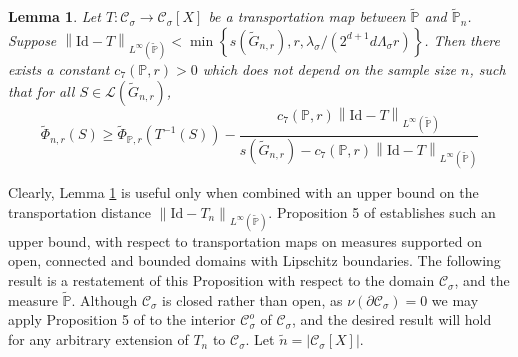 \documentclass[11pt,twoside]{article}
\newtheorem{lemma}{Lemma}
\newcommand{\set}[1]{\left\{#1\right\}}
\newcommand{\abs}[1]{\left \lvert #1 \right \rvert}
\newcommand{\norm}[1]{\left\lVert#1\right\rVert}
\newcommand{\1}{\mathbf{1}}
\newcommand{\Xbf}{X}             %
\newcommand{\Pbb}{\mathbb{P}}
\newcommand{\Cset}{\mathcal{C}}
\newcommand{\Csig}{\Cset_{\sigma}}
\begin{document}
\begin{lemma}
	\label{lem: graph_to_continuous_conductance}
	Let $T:\Csig \to \Csig[\Xbf]$ be a transportation map between $\widetilde{\Pbb}$ and $\widetilde{\Pbb}_n$. Suppose $\norm{\mathrm{Id} - T}_{L^{\infty}(\widetilde{\Pbb})} < \min \set{s(\widetilde{G}_{n,r}),r, \lambda_{\sigma}/(2^{d+1}d\Lambda_{\sigma}r)}$. Then there exists a constant $c_7(\Pbb,r) > 0$ which does not depend on the sample size $n$, such that for all $S \in \mathcal{L}(\widetilde{G}_{n,r})$, 
	\begin{equation}
	\label{eqn: graph_to_continuous_conductance}
	\widetilde{\Phi}_{n,r}(S) \geq \widetilde{\Phi}_{\Pbb,r}(T^{-1}(S)) - \frac{c_7(\Pbb,r)\norm{\mathrm{Id} - T}_{L^{\infty}(\widetilde{\Pbb})} }{s(\widetilde{G}_{n,r}) - c_7(\Pbb,r) \norm{\mathrm{Id} - T}_{L^{\infty}(\widetilde{\Pbb})}  }
	\end{equation}
\end{lemma}

Clearly, Lemma \ref{lem: graph_to_continuous_conductance} is useful only when combined with an upper bound on the transportation distance $\norm{\mathrm{Id} - T_n}_{L^{\infty}(\widetilde{\Pbb})}$. Proposition 5 of \cite{garciatrillos16} establishes such an upper bound, with respect to transportation maps on measures supported on open, connected and bounded domains with Lipschitz boundaries. The following result is a restatement of this Proposition with respect to the domain $\Csig$, and the measure $\widetilde{\Pbb}$. Although $\Csig$ is closed rather than open, as $\nu(\partial \Csig) = 0$ we may apply Proposition 5 of \cite{garciatrillos16} to the interior $\Csig^o$ of $\Csig$, and the desired result will hold for any arbitrary extension of $T_n$ to $\Csig$. Let $\widetilde{n} = \abs{\Csig[\Xbf]}$. 
\end{document}
